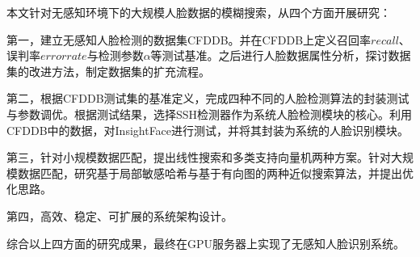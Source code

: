 
\begin{summary}

本文针对无感知环境下的大规模人脸数据的模糊搜索，从四个方面开展研究：

第一，建立无感知人脸检测的数据集CFDDB。并在CFDDB上定义召回率$recall$、误判率$errorrate$与检测参数$\alpha$等测试基准。之后进行人脸数据属性分析，探讨数据集的改进方法，制定数据集的扩充流程。

第二，根据CFDDB测试集的基准定义，完成四种不同的人脸检测算法的封装测试与参数调优。根据测试结果，选择SSH检测器\cite{najibi2017ssh}作为系统人脸检测模块的核心。利用CFDDB中的数据，对InsightFace\cite{deng2018arcface}进行测试，并将其封装为系统的人脸识别模块。

第三，针对小规模数据匹配，提出线性搜索和多类支持向量机两种方案。针对大规模数据匹配，研究基于局部敏感哈希与基于有向图的两种近似搜索算法，并提出优化思路。

第四，高效、稳定、可扩展的系统架构设计。

综合以上四方面的研究成果，最终在GPU服务器上实现了无感知人脸识别系统。

\end{summary}
